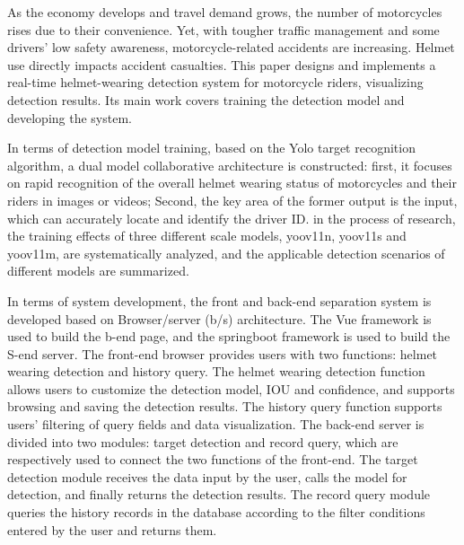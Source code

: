 As the economy develops and travel demand grows, the number of motorcycles rises due to their convenience. Yet, with tougher traffic management and some drivers' low safety awareness, motorcycle-related accidents are increasing. Helmet use directly impacts accident casualties. This paper designs and implements a real-time helmet-wearing detection system for motorcycle riders, visualizing detection results. Its main work covers training the detection model and developing the system.

In terms of detection model training, based on the Yolo target recognition algorithm, a dual model collaborative architecture is constructed: first, it focuses on rapid recognition of the overall helmet wearing status of motorcycles and their riders in images or videos; Second, the key area of the former output is the input, which can accurately locate and identify the driver ID. in the process of research, the training effects of three different scale models, yoov11n, yoov11s and yoov11m, are systematically analyzed, and the applicable detection scenarios of different models are summarized.

In terms of system development, the front and back-end separation system is developed based on Browser/server (b/s) architecture. The Vue framework is used to build the b-end page, and the springboot framework is used to build the S-end server. The front-end browser provides users with two functions: helmet wearing detection and history query. The helmet wearing detection function allows users to customize the detection model, IOU and confidence, and supports browsing and saving the detection results. The history query function supports users' filtering of query fields and data visualization. The back-end server is divided into two modules: target detection and record query, which are respectively used to connect the two functions of the front-end. The target detection module receives the data input by the user, calls the model for detection, and finally returns the detection results. The record query module queries the history records in the database according to the filter conditions entered by the user and returns them.